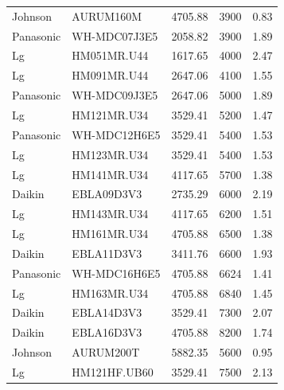 \begin{table}[htbp]
\begin{tabular}{llrrr}
		Johnson    & AURUM160M      & 4705.88                           & 3900           & 0.83      \\
		Panasonic  & WH-MDC07J3E5   & 2058.82                           & 3900           & 1.89      \\
		Lg         & HM051MR.U44    & 1617.65                           & 4000           & 2.47      \\
		Lg         & HM091MR.U44    & 2647.06                           & 4100           & 1.55      \\
		Panasonic  & WH-MDC09J3E5   & 2647.06                           & 5000           & 1.89      \\
		Lg         & HM121MR.U34    & 3529.41                           & 5200           & 1.47      \\
		Panasonic  & WH-MDC12H6E5   & 3529.41                           & 5400           & 1.53      \\
		Lg         & HM123MR.U34    & 3529.41                           & 5400           & 1.53      \\
		Lg         & HM141MR.U34    & 4117.65                           & 5700           & 1.38      \\
		Daikin     & EBLA09D3V3     & 2735.29                           & 6000           & 2.19      \\
		Lg         & HM143MR.U34    & 4117.65                           & 6200           & 1.51      \\
		Lg         & HM161MR.U34    & 4705.88                           & 6500           & 1.38      \\
		Daikin     & EBLA11D3V3     & 3411.76                           & 6600           & 1.93      \\
		Panasonic  & WH-MDC16H6E5   & 4705.88                           & 6624           & 1.41      \\
		Lg         & HM163MR.U34    & 4705.88                           & 6840           & 1.45      \\
		Daikin     & EBLA14D3V3     & 3529.41                           & 7300           & 2.07      \\
		Daikin     & EBLA16D3V3     & 4705.88                           & 8200           & 1.74      \\
		Johnson    & AURUM200T      & 5882.35                           & 5600           & 0.95      \\
		Lg         & HM121HF.UB60   & 3529.41                           & 7500           & 2.13      \\

\end{tabular}
\end{table}
